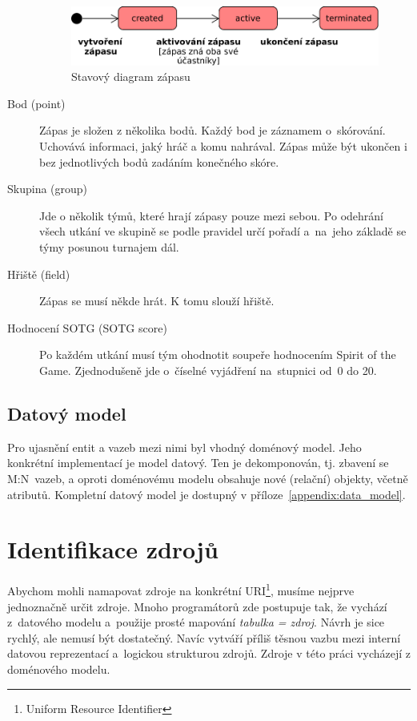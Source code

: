 \begin{description}
\begin{figure}[ht!]
      \centering
      \includegraphics[width=110mm]{./images/stavovy-diagram-zapas.pdf}
      \caption{Stavový diagram zápasu\label{overflow}}
      \label{fig:state_match}
    \end{figure}
  \item[Bod (point)]
    Zápas je složen z několika bodů. Každý bod je záznamem o~skórování. Uchovává informaci, jaký hráč a komu nahrával.
    Zápas může být ukončen i bez jednotlivých bodů zadáním konečného skóre.
  \item[Skupina (group)]
    Jde o několik týmů, které hrají zápasy pouze mezi sebou. Po odehrání všech utkání ve skupině se podle pravidel určí pořadí a~na~jeho základě se týmy posunou turnajem dál.
  \item[Hřiště (field)]
    Zápas se musí někde hrát. K tomu slouží hřiště.
  \item[Hodnocení SOTG (SOTG score)]
    Po každém utkání musí tým ohodnotit soupeře hodnocením Spirit of the Game. Zjednodušeně jde o~číselné vyjádření na~stupnici od~0 do 20.
\end{description}

\subsection{Datový model}

Pro ujasnění entit a vazeb mezi nimi byl vhodný doménový model. Jeho konkrétní implementací je model datový.
Ten je dekomponován, tj. zbavení se M:N~vazeb, a oproti doménovému modelu obsahuje nové
(relační) objekty, včetně atributů. Kompletní datový model je dostupný v příloze~\ref{appendix:data_model}.

\section{Identifikace zdrojů}


Abychom mohli namapovat zdroje na konkrétní URI\footnote{Uniform Resource Identifier},
musíme nejprve jedno\-značně určit zdroje. Mnoho programátorů zde postupuje tak, že vychází
z~datového modelu a~použije prosté mapování \textit{tabulka = zdroj}.
Návrh je sice rychlý, ale nemusí být dostatečný. Navíc vytváří příliš těsnou vazbu mezi interní datovou reprezentací
a~logickou strukturou zdrojů. Zdroje v této práci vycházejí z doménového modelu.

